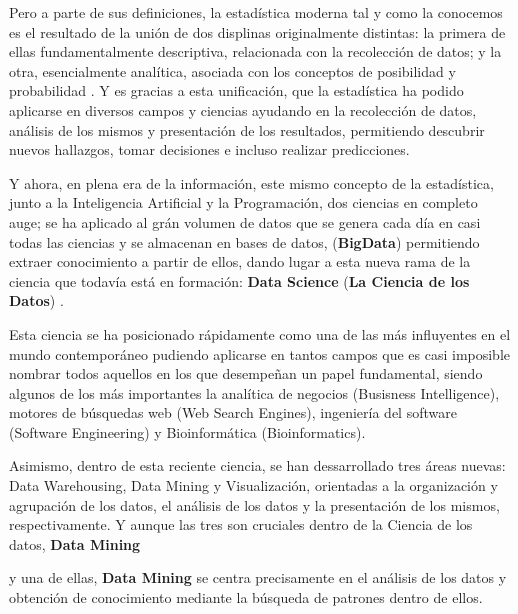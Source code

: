 \documentclass[3p,twocolumn]{elsarticle}
\begin{document}
Pero a parte de sus definiciones, la estadística moderna tal y como la conocemos es el resultado de la unión de dos displinas originalmente distintas: la primera de ellas fundamentalmente descriptiva, relacionada con la recolección de datos; y la otra, esencialmente analítica, asociada con los conceptos de posibilidad y probabilidad \cite{cita3}. Y es gracias a esta unificación, que la estadística ha podido aplicarse en diversos campos y ciencias ayudando en la recolección de datos, análisis de los mismos y presentación de los resultados, permitiendo descubrir nuevos hallazgos, tomar decisiones e incluso realizar predicciones.

Y ahora, en plena era de la información, este mismo concepto de la estadística, junto a la Inteligencia Artificial y la Programación, dos ciencias en completo auge; se ha aplicado al grán volumen de datos que se genera cada día en casi todas las ciencias y se almacenan en bases de datos, (\textbf{BigData}) permitiendo extraer conocimiento a partir de ellos, dando lugar a esta nueva rama de la ciencia que todavía está en formación: \textbf{Data Science} (\textbf{La Ciencia de los Datos}) \cite{cita4}. 

Esta ciencia se ha posicionado rápidamente como una de las más influyentes en el mundo contemporáneo pudiendo aplicarse en tantos campos que es casi imposible nombrar todos aquellos en los que desempeñan un papel fundamental, siendo algunos de los más importantes la analítica de negocios (Busisness Intelligence), motores de búsquedas web (Web Search Engines), ingeniería del software (Software Engineering) y Bioinformática (Bioinformatics).

Asimismo, dentro de esta reciente ciencia, se han dessarrollado tres áreas nuevas: Data Warehousing, Data Mining y Visualización, orientadas a la organización y agrupación de los datos, el análisis de los datos y la presentación de los mismos, respectivamente. Y aunque las tres son cruciales dentro de la Ciencia de los datos, \textbf{Data Mining} 


y una de ellas, \textbf{Data Mining} se centra precisamente en el análisis de los datos y obtención de conocimiento mediante la búsqueda de patrones dentro de ellos.
 

\newpage
\end{document}
